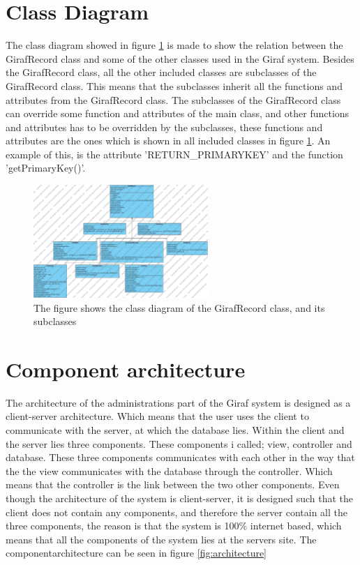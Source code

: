 \section{Class Diagram}

The class diagram showed in figure \ref{fig:diagram} is made to show the relation between the GirafRecord class and some of the other classes used in the Giraf system.
Besides the GirafRecord class, all the other included classes are subclasses of the GirafRecord class. This means that the subclasses inherit all the functions and attributes from the GirafRecord class.
The subclasses of the GirafRecord class can override some function and attributes of the main class, and other functions and attributes has to be overridden by the subclasses, these functions and attributes are the ones which is shown in all included classes in figure \ref{fig:diagram}.
An example of this, is the attribute 'RETURN\_PRIMARYKEY' and the function 'getPrimaryKey()'.
  
\begin{figure}[h]
\centering
\includegraphics[width=250px]{img/classdiagram_Project.jpg}
\caption{The figure shows the class diagram of the GirafRecord class, and its subclasses}
\label{fig:diagram}
\end{figure}

\section{Component architecture}

The architecture of the administrations part of the Giraf system is designed as a client-server architecture. Which means that the user uses the client to communicate with the server, at which the database lies. Within the client and the server lies three components. These components i called; view, controller and database. These three components communicates with each other in the way that the the view communicates with the database through the controller. Which means that the controller is the link between the two other components. Even though the architecture of the system is client-server, it is designed such that the client does not contain any components, and therefore the server contain all the three components, the reason is that the system is 100\% internet based, which means that all the components of the system lies at the servers site. The componentarchitecture can be seen in figure \ref{fig:architecture}


